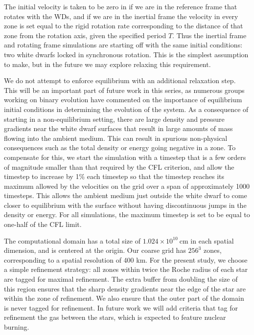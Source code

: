 \documentclass[iop]{../emulateapj}
\begin{document}
The initial velocity is taken to be zero in if we are in the reference
frame that rotates with the WDs, and if we are in the inertial frame
the velocity in every zone is set equal to the rigid rotation rate 
corresponding to the distance of that zone from the rotation axis, given
the specified period $T$. Thus the inertial frame and rotating frame 
simulations are starting off with the same initial conditions: two white 
dwarfs locked in synchronous rotation. This is the simplest assumption to 
make, but in the future we may explore relaxing this requirement.

We do not attempt to enforce equilibrium with an additional relaxation
step. This will be an important part of future work in this series, as
numerous groups working on binary evolution
\citep{swc:2000,motl:2002,rosswog:2004,dan:2011,pakmor:2012:gadget}
have commented on the importance of equilibrium initial conditions in
determining the evolution of the system. As a consequence of starting 
in a non-equilibrium setting, there are 
large density and pressure gradients near the white dwarf surfaces
that result in large amounts of mass flowing into the ambient
medium. This can result in spurious non-physical consequences such as 
the total density or energy going negative in a zone. To compensate 
for this, we start the simulation with a timestep that is a few orders 
of magnitude smaller than that required by the CFL criterion, and allow
the timestep to increase by 1\% each timestep so that the timestep reaches 
its maximum allowed by the velocities on the grid over a span of approximately 
1000 timesteps. This allows the ambient medium just outside the white dwarf
to come closer to equilibrium with the surface without having 
discontinuous jumps in the density or energy. For all simulations, 
the maximum timestep is set to be equal to one-half of the CFL limit.

The computational domain has a total size of $1.024 \times
10^{10}\ \text{cm}$ in each spatial dimension, and is centered at the
origin. Our coarse grid has $256^3$ zones, corresponding to a spatial
resolution of 400 km. For the present study, we choose a simple
refinement strategy: all zones within twice the Roche radius of each
star are tagged for maximal refinement. The extra buffer from doubling
the size of this region ensures that the sharp density gradients near
the edge of the star are within the zone of refinement. We also ensure
that the outer part of the domain is never tagged for refinement. In
future work we will add criteria that tag for refinement the gas
between the stars, which is expected to feature nuclear burning.
\end{document}
